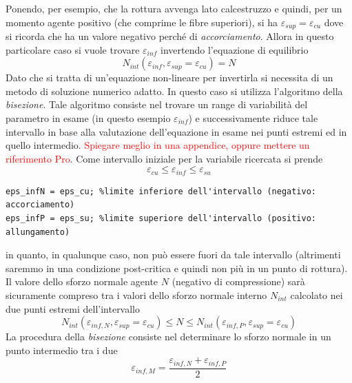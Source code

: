 \documentclass[10pt]{article}
\begin{document}
Ponendo, per esempio, che la rottura avvenga lato calcestruzzo e quindi, per un momento agente positivo (che comprime le fibre superiori), si ha $\varepsilon_{sup} = \varepsilon_{cu}$ dove si ricorda che ha un valore negativo perché di \emph{accorciamento}. Allora in questo particolare caso si vuole trovare $\varepsilon_{inf}$ invertendo l'equazione di equilibrio
\begin{equation}
N_{int}(\varepsilon_{inf},\varepsilon_{sup}=\varepsilon_{cu}) = N
\end{equation}
Dato che si tratta di un'equazione non-lineare per invertirla si necessita di un metodo di soluzione numerico adatto. In questo caso si utilizza l'algoritmo della \textit{bisezione}. Tale algoritmo consiste nel trovare un range di variabilità del parametro in esame (in questo esempio $\varepsilon_{inf}$) e successivamente riduce tale intervallo in base alla valutazione dell'equazione in esame nei punti estremi ed in quello intermedio. \textcolor{red}{Spiegare meglio in una appendice, oppure mettere un riferimento Pro}.
Come intervallo iniziale per la variabile ricercata si prende
\begin{equation}
\varepsilon_{cu} \leq \varepsilon_{inf} \leq \varepsilon_{su}
\end{equation}
\begin{lstlisting}
eps_infN = eps_cu; %limite inferiore dell'intervallo (negativo: accorciamento)
eps_infP = eps_su; %limite superiore dell'intervallo (positivo: allungamento)
\end{lstlisting}
in quanto, in qualunque caso, non può essere fuori da tale intervallo (altrimenti saremmo in una condizione post-critica e quindi non più in un punto di rottura).
Il valore dello sforzo normale agente $N$ (negativo di compressione) sarà sicuramente compreso tra i valori dello sforzo normale interno $N_{int}$ calcolato nei due punti estremi dell'intervallo
\begin{equation}
N_{int}(\varepsilon_{inf,N},\varepsilon_{sup}=\varepsilon_{cu}) 
\leq N \leq
N_{int}(\varepsilon_{inf,P},\varepsilon_{sup}=\varepsilon_{cu}) 
\end{equation}
La procedura della \emph{bisezione} consiste nel determinare lo sforzo normale in un punto intermedio tra i due
\begin{equation}
\varepsilon_{inf,M} = \frac{\varepsilon_{inf,N} + \varepsilon_{inf,P}}{2}
\end{equation}
\end{document}
